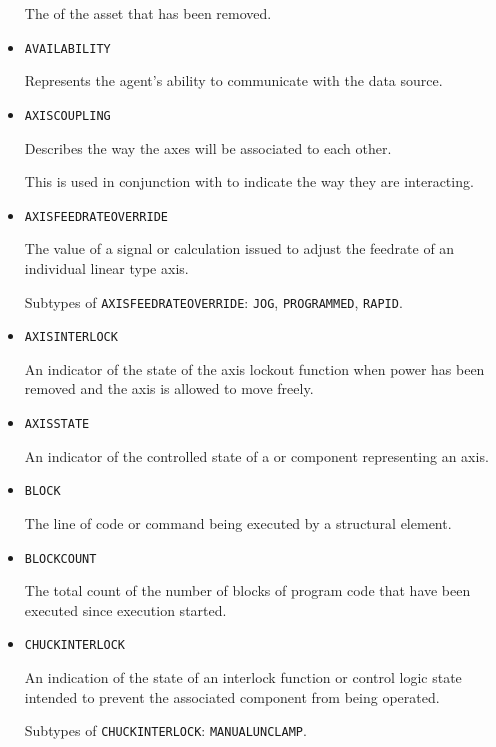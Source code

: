 \begin{itemize}
The  of the asset that has been removed.


\item \texttt{AVAILABILITY}  

Represents the \gls{agent}'s ability to communicate with the data source.


\item \texttt{AXIS\textunderscore COUPLING}  

Describes the way the axes will be associated to each other. 
  
This is used in conjunction with  to indicate the way they are interacting.


\item \texttt{AXIS\textunderscore FEEDRATE\textunderscore OVERRIDE}  

The value of a signal or calculation issued to adjust the feedrate of an individual linear type axis.

Subtypes of \texttt{AXIS\textunderscore FEEDRATE\textunderscore OVERRIDE}: \texttt{JOG}, \texttt{PROGRAMMED}, \texttt{RAPID}.

\item \texttt{AXIS\textunderscore INTERLOCK}  

An indicator of the state of the axis lockout function when power has been removed and the axis is allowed to move freely.


\item \texttt{AXIS\textunderscore STATE}  

An indicator of the controlled state of a  or  component representing an axis.


\item \texttt{BLOCK}  

The line of code or command being executed by a  \gls{structural element}.


\item \texttt{BLOCK\textunderscore COUNT}  

The total count of the number of blocks of program code that have been executed since execution started.


\item \texttt{CHUCK\textunderscore INTERLOCK}  

An indication of the state of an interlock function or control logic state intended to prevent the associated  component from being operated.

Subtypes of \texttt{CHUCK\textunderscore INTERLOCK}: \texttt{MANUAL\textunderscore UNCLAMP}.


\end{itemize}
